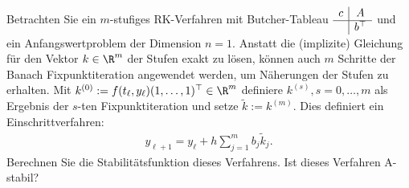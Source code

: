 \begin{exercise}
Betrachten Sie ein $m$-stufiges RK-Verfahren mit Butcher-Tableau
$\begin{array}{c|c}
  c &  A \\ \hline  & b^{\top}
\end{array}$ und ein Anfangswertproblem der Dimension $n = 1$.
Anstatt die (implizite) Gleichung für den Vektor $k \in \R^m$ der Stufen exakt
zu lösen, können auch $m$ Schritte der Banach Fixpunktiteration angewendet werden,
um Näherungen der Stufen zu erhalten. Mit $k^{(0)} := f(t_{\ell},y_{\ell})(1,\dots,1)^{\top} \in \R^m$
definiere $k^{(s)}, s = 0,\dots,m$ als Ergebnis der $s$-ten Fixpunktiteration und setze
$\widetilde{k} := k^{(m)}$. Dies definiert ein Einschrittverfahren:
\begin{align*}
  y_{\ell + 1} = y_{\ell} + h\sum_{j = 1}^m b_j \widetilde{k}_j.
\end{align*}
Berechnen Sie die Stabilitätsfunktion dieses Verfahrens. Ist dieses Verfahren
A-stabil?
\end{exercise}
